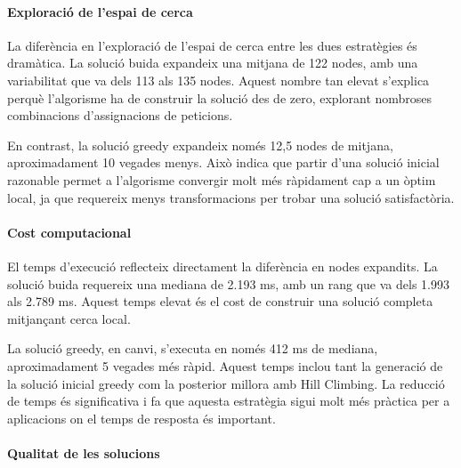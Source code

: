 \paragraph{Exploració de l'espai de cerca}

\vspace{0.5cm}

\vspace{0.5cm}

La diferència en l'exploració de l'espai de cerca entre les dues estratègies és dramàtica. La solució buida expandeix una mitjana de 122 nodes, amb una variabilitat que va dels 113 als 135 nodes. Aquest nombre tan elevat s'explica perquè l'algorisme ha de construir la solució des de zero, explorant nombroses combinacions d'assignacions de peticions.

En contrast, la solució greedy expandeix només 12,5 nodes de mitjana, aproximadament 10 vegades menys. Això indica que partir d'una solució inicial razonable permet a l'algorisme convergir molt més ràpidament cap a un òptim local, ja que requereix menys transformacions per trobar una solució satisfactòria.

\paragraph{Cost computacional}

\vspace{0.5cm}

\vspace{0.5cm}

El temps d'execució reflecteix directament la diferència en nodes expandits. La solució buida requereix una mediana de 2.193 ms, amb un rang que va dels 1.993 als 2.789 ms. Aquest temps elevat és el cost de construir una solució completa mitjançant cerca local.

La solució greedy, en canvi, s'executa en només 412 ms de mediana, aproximadament 5 vegades més ràpid. Aquest temps inclou tant la generació de la solució inicial greedy com la posterior millora amb Hill Climbing. La reducció de temps és significativa i fa que aquesta estratègia sigui molt més pràctica per a aplicacions on el temps de resposta és important.

\paragraph{Qualitat de les solucions}

\vspace{0.5cm}

\vspace{0.5cm}

